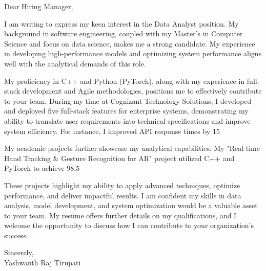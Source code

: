 \documentclass[letterpaper,11pt]{article}
\begin{document}
\begin{flushleft}
Dear Hiring Manager,

\vspace{12pt}

I am writing to express my keen interest in the Data Analyst position.  My background in software engineering, coupled with my Master's in Computer Science and focus on data science, makes me a strong candidate. My experience in developing high-performance models and optimizing system performance aligns well with the analytical demands of this role.

\vspace{12pt}

My proficiency in C++ and Python (PyTorch), along with my experience in full-stack development and Agile methodologies, positions me to effectively contribute to your team.  During my time at Cognizant Technology Solutions, I developed and deployed five full-stack features for enterprise systems, demonstrating my ability to translate user requirements into technical specifications and improve system efficiency.  For instance, I improved API response times by 15%

\vspace{12pt}

My academic projects further showcase my analytical capabilities.  My "Real-time Hand Tracking & Gesture Recognition for AR" project utilized C++ and PyTorch to achieve 98.5%


\vspace{12pt}

These projects highlight my ability to apply advanced techniques, optimize performance, and deliver impactful results.  I am confident my skills in data analysis, model development, and system optimization would be a valuable asset to your team.  My resume offers further details on my qualifications, and I welcome the opportunity to discuss how I can contribute to your organization’s success.

\vspace{20pt}

Sincerely, \\
\vspace{15pt}
Yashwanth Raj Tirupati

\end{flushleft}
\end{document}
